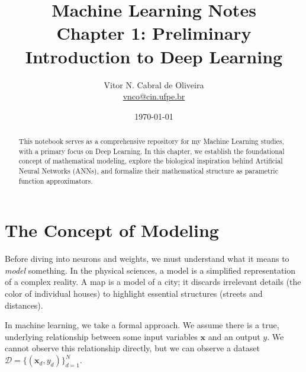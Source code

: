 \documentclass{tufte-handout}
\title{Machine Learning Notes \\ Chapter 1: Preliminary Introduction to Deep Learning}
\author{Vitor N. Cabral de Oliveira\\ \href{mailto:vnco@cin.ufpe.br}{vnco@cin.ufpe.br}}
\date{\today}
\begin{document}
\maketitle
\begin{abstract}
    This notebook serves as a comprehensive repository for my Machine Learning studies, with a primary focus on Deep Learning. In this chapter, we establish the foundational concept of mathematical modeling, explore the biological inspiration behind Artificial Neural Networks (ANNs), and formalize their mathematical structure as parametric function approximators.
\end{abstract}

\newpage
\hypersetup{linkcolor=wp-text}
\tableofcontents
\hypersetup{linkcolor=wp-primary}
\newpage

\section{The Concept of Modeling}

Before diving into neurons and weights, we must understand what it means to \textit{model} something. In the physical sciences, a model is a simplified representation of a complex reality. A map is a model of a city; it discards irrelevant details (the color of individual houses) to highlight essential structures (streets and distances). 

In machine learning, we take a formal approach. We assume there is a true, underlying relationship between some input variables $\mathbf{x}$ and an output $y$. We cannot observe this relationship directly, but we can observe a dataset $\mathcal{D} = \{(\mathbf{x}_d, y_d)\}_{d=1}^N$. 

\begin{marginfigure}[-2.0cm]
\centering
{}
\caption{The standard ML pipeline: a model $f_\theta$ maps inputs to outputs.}
\label{fig:modeling_pipeline}
\end{marginfigure}
\end{document}
